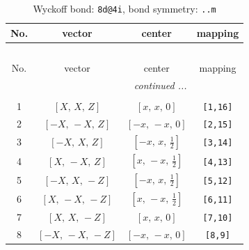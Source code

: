 \documentclass[fleqn,8pt]{jsarticle}
\begin{document}
\renewcommand{\arraystretch}{1.2}
\begin{longtable}{cccc}
\caption{Wyckoff bond: {\tt 8d@4i}, bond symmetry: {\tt ..m}}
 \\
 \hline \hline
No. & vector & center & mapping \\ \hline \endfirsthead

\multicolumn{3}{l}{\tablename\ \thetable{}} \\
 \hline \hline
No. & vector & center & mapping \\ \hline \endhead

 \hline \hline
\multicolumn{3}{r}{\footnotesize\it continued ...} \\ \endfoot

 \hline \hline
\multicolumn{3}{r}{} \\ \endlastfoot

1 & $\left[ X,\, X,\, Z \right]$ & $\left[ x,\, x,\, 0 \right]$ & {\tt [1,16]} \\ \hline
2 & $\left[ - X,\, - X,\, Z \right]$ & $\left[ - x,\, - x,\, 0 \right]$ & {\tt [2,15]} \\ \hline
3 & $\left[ - X,\, X,\, Z \right]$ & $\left[ - x,\, x,\, \frac{1}{2} \right]$ & {\tt [3,14]} \\ \hline
4 & $\left[ X,\, - X,\, Z \right]$ & $\left[ x,\, - x,\, \frac{1}{2} \right]$ & {\tt [4,13]} \\ \hline
5 & $\left[ - X,\, X,\, - Z \right]$ & $\left[ - x,\, x,\, \frac{1}{2} \right]$ & {\tt [5,12]} \\ \hline
6 & $\left[ X,\, - X,\, - Z \right]$ & $\left[ x,\, - x,\, \frac{1}{2} \right]$ & {\tt [6,11]} \\ \hline
7 & $\left[ X,\, X,\, - Z \right]$ & $\left[ x,\, x,\, 0 \right]$ & {\tt [7,10]} \\ \hline
8 & $\left[ - X,\, - X,\, - Z \right]$ & $\left[ - x,\, - x,\, 0 \right]$ & {\tt [8,9]} \\
\end{longtable}
\renewcommand{\arraystretch}{1.2}
\end{document}
